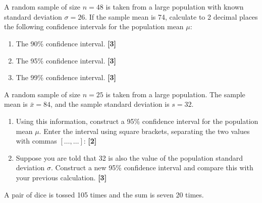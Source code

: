 \documentclass[a4paper, leqno, 12pt]{article} %
\newenvironment{top_enumerate}{
\begin{enumerate}
  \setlength{\itemsep}{2em}
  \setlength{\topsep}{-0pt}
  \setlength{\partopsep}{-0pt}
}{\end{enumerate}}
\begin{document}
\section*{}

\begin{top_enumerate}

\item A random sample of size $n={48}$ is taken from a large population with known standard deviation $\sigma = {26}$. If the sample mean is {74}, calculate to 2 decimal places the following confidence intervals for the population mean $\mu$:
 
\setcounter{equation}{0}  %
\begin{enumerate}
	\setlength{\topsep}{-0pt}
	\setlength{\partopsep}{-0pt}
	\setlength{\itemsep}{10pt}
			\item The 90\% confidence interval.
	 \quad \textbf{[3]}
		\item The 95\% confidence interval.
	 \quad \textbf{[3]}
		\item The 99\% confidence interval.
	 \quad \textbf{[3]}
\end{enumerate}\item A random sample of size $n={25}$ is taken from a large population. The sample mean is $\bar x = {84}$, and the sample standard deviation is $s = {32}$.
 
\setcounter{equation}{0}  %
\begin{enumerate}
	\setlength{\topsep}{-0pt}
	\setlength{\partopsep}{-0pt}
	\setlength{\itemsep}{10pt}
			\item Using this information, construct a 95\% confidence interval for the population mean $\mu$. Enter the interval using square brackets, separating the two values with commas $\left[\dots ,\dots \right]$:
	 \quad \textbf{[2]}
		\item Suppose you are told that {32} is also the value of the population standard deviation $\sigma$. Construct a new 95\% confidence interval and compare this with your previous calculation.
	 \quad \textbf{[3]}
\end{enumerate}\item A pair of dice is tossed {105} times and the sum is seven {20} times.
 

\end{top_enumerate}
\end{document}
